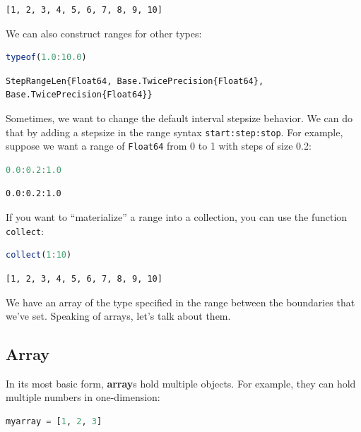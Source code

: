\documentclass[
  notoc %
]{tufte-book}
\newcommand{\passthrough}[1]{#1}
\begin{document}
\begin{lstlisting}[language=Output]
[1, 2, 3, 4, 5, 6, 7, 8, 9, 10]
\end{lstlisting}

We can also construct ranges for other types:

\begin{lstlisting}[language=Julia]
typeof(1.0:10.0)
\end{lstlisting}

\begin{lstlisting}[language=Output]
StepRangeLen{Float64, Base.TwicePrecision{Float64}, Base.TwicePrecision{Float64}}
\end{lstlisting}

Sometimes, we want to change the default interval stepsize behavior. We
can do that by adding a stepsize in the range syntax
\passthrough{\lstinline!start:step:stop!}. For example, suppose we want
a range of \passthrough{\lstinline!Float64!} from 0 to 1 with steps of
size 0.2:

\begin{lstlisting}[language=Julia]
0.0:0.2:1.0
\end{lstlisting}

\begin{lstlisting}[language=Output]
0.0:0.2:1.0
\end{lstlisting}

If you want to ``materialize'' a range into a collection, you can use
the function \passthrough{\lstinline!collect!}:

\begin{lstlisting}[language=Julia]
collect(1:10)
\end{lstlisting}

\begin{lstlisting}[language=Output]
[1, 2, 3, 4, 5, 6, 7, 8, 9, 10]
\end{lstlisting}

We have an array of the type specified in the range between the
boundaries that we've set. Speaking of arrays, let's talk about them.

\hypertarget{sec:array}{%
\subsection{Array}\label{sec:array}}

In its most basic form, \textbf{array}s hold multiple objects. For
example, they can hold multiple numbers in one-dimension:

\begin{lstlisting}[language=Julia]
myarray = [1, 2, 3]
\end{lstlisting}
\end{document}
